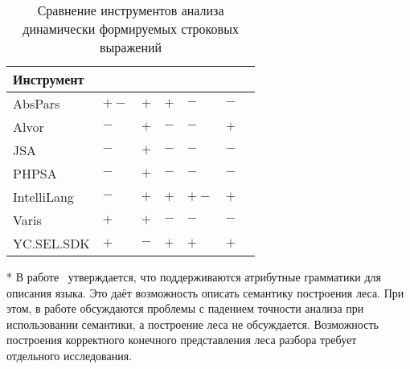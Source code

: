 \begin{table} [htbp]
  \centering
\parbox{14cm}{\caption{Сравнение инструментов анализа динамически формируемых строковых выражений}\label{tbl:comparison}}
\begin{threeparttable}
  
  \begin{tabular}{| p{2.7cm} || p{2.4cm} | p{2.4cm} | p{2.4cm} | p{2.4cm} | p{2.4cm}l |}
  \hline                               
  \hline
  {Инструмент}   &\centering {Лес разбора}           &\centering {Синт. ошибки}        &\centering {Сем. ошибки}    &\centering {Платформа}         &\centering {Модульность} & \\
  \hline                                                                                                                                       
  AbsPars        &\centering  $+-$\tnote{*}          &\centering  $+$                  &\centering  $+$             &\centering  $-$                &\centering  $-$        & \\
  Alvor          &\centering  $-$                    &\centering  $+$                  &\centering  $-$             &\centering  $-$                &\centering  $+$        &\\
  JSA            &\centering  $-$                    &\centering  $+$                  &\centering  $-$             &\centering  $-$                &\centering  $-$        &\\
  PHPSA          &\centering  $-$                    &\centering  $+$                  &\centering  $-$             &\centering  $-$                &\centering  $-$        &\\
  IntelliLang    &\centering  $-$                    &\centering  $+$                  &\centering  $+$             &\centering  $+-$\tnote{**}     &\centering  $+$        &\\
  Varis          &\centering  $+$\tnote{***}         &\centering  $+$                  &\centering  $-$             &\centering  $-$                &\centering  $-$        &\\
  YC.SEL.SDK     &\centering  $+$                    &\centering  $-$\tnote{****}      &\centering  $+$             &\centering  $+$                &\centering  $+$        &\\
  \hline
  \hline
  \end{tabular}\small{
  \begin{tablenotes}
            \item[*] В работе~\cite{LRAbstractParsingSema} утверждается, что поддерживаются атрибутные грамматики для описания языка. Это даёт возможность описать семантику построения леса. При этом, в работе обсуждаются проблемы с падением точности анализа при использовании семантики, а построение леса не обсуждается. Возможность построения корректного конечного представления леса разбора требует отдельного исследования.

\end{tablenotes}}
\end{threeparttable}
\end{table}
